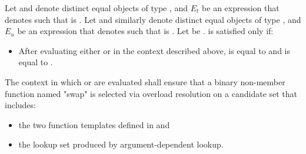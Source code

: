 {\color{remclr}
\begin{itemdescr}
\pnum
Let  and  denote distinct equal objects of type
, and $E_t$ be an expression that denotes 
such that  is .
Let  and  similarly denote distinct equal objects of type
, and $E_u$ be an expression that denotes 
such that  is . Let  be
.
 is satisfied only if:

\begin{itemize}
\item After evaluating either  or  in the
  context described above,  is equal to  and  is
  equal to .
\end{itemize}

\pnum
The context in which  or  are evaluated shall ensure that a binary non-member
function named "swap" is selected via overload resolution on a candidate set that includes:
\begin{itemize}
\item the two  function templates defined in  and
\item the lookup set produced by argument-dependent lookup.
\end{itemize}
\end{itemdescr}
} %

